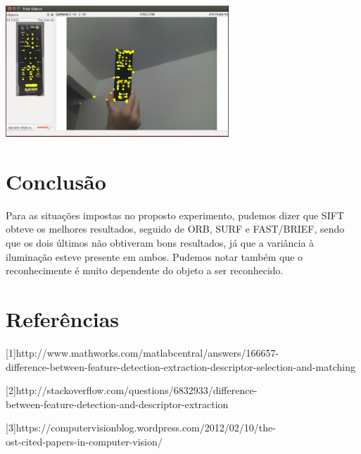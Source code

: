 \documentclass[conference]{IEEEtran}
\begin{document}
		\vspace{2\baselineskip}\vspace{-\parskip}
 		\begin{minipage}{\linewidth}
 		\centering
 		\includegraphics[width=3.3in]{controle3longe}
 		\end{minipage} 
 
 
 \vspace{1.2\baselineskip}\vspace{-\parskip} 
	
	
\section{Conclus\~ao} 
\label{sec:meth} 

\nobreak\hspace{.16667em plus .08333em} 
Para as situa\c{c}\~oes impostas no proposto experimento, pudemos dizer que SIFT obteve os melhores resultados, seguido de ORB, 
SURF e FAST/BRIEF, sendo que os dois \'ultimos n\~ao obtiveram bons resultados, j\'a que a vari\^ancia \`a ilumina\c{c}\~ao 
esteve presente em ambos. Pudemos notar tamb\'em que o reconhecimente \'e muito dependente do objeto a ser reconhecido.


\section{Refer\^encias} 
\label{sec:meth} 

[1]http://www.mathworks.com/matlabcentral/answers/166657-\\
difference-between-feature-detection-extraction-descriptor-selection-and-matching
    
[2]http://stackoverflow.com/questions/6832933/difference-\\
between-feature-detection-and-descriptor-extraction

[3]https://computervisionblog.wordpress.com/2012/02/10/the-\\
ost-cited-papers-in-computer-vision/
\end{document}

